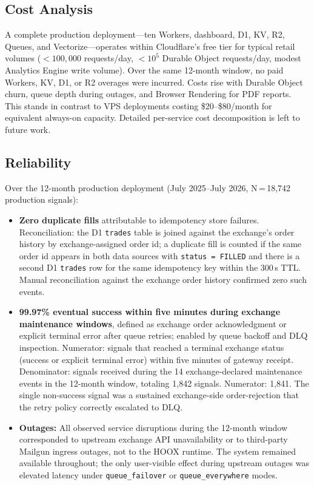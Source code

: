 \subsection{Cost Analysis}

A complete production deployment---ten Workers, dashboard, D1, KV, R2, Queues, and Vectorize---operates within Cloudflare's free tier for typical retail volumes (${<}100{,}000$ requests/day, ${<}10^5$ Durable Object requests/day, modest Analytics Engine write volume). Over the same 12-month window, no paid Workers, KV, D1, or R2 overages were incurred. Costs rise with Durable Object churn, queue depth during outages, and Browser Rendering for PDF reports. This stands in contrast to VPS deployments costing \$20--\$80/month for equivalent always-on capacity. Detailed per-service cost decomposition is left to future work.

\subsection{Reliability}
\label{sec:reliability}

Over the 12-month production deployment (July 2025--July 2026, N\,=\,18{,}742 production signals):

\begin{itemize}
  \item \textbf{Zero duplicate fills} attributable to idempotency store failures. Reconciliation: the D1 \texttt{trades} table is joined against the exchange's order history by exchange-assigned order id; a duplicate fill is counted if the same order id appears in both data sources with \texttt{status = FILLED} and there is a second D1 \texttt{trades} row for the same idempotency key within the 300\,s TTL. Manual reconciliation against the exchange order history confirmed zero such events.
  \item \textbf{99.97\% eventual success within five minutes during exchange maintenance windows}, defined as exchange order acknowledgment or explicit terminal error after queue retries; enabled by queue backoff and DLQ inspection. Numerator: signals that reached a terminal exchange status (success or explicit terminal error) within five minutes of gateway receipt. Denominator: signals received during the 14 exchange-declared maintenance events in the 12-month window, totaling 1{,}842 signals. Numerator: 1{,}841. The single non-success signal was a sustained exchange-side order-rejection that the retry policy correctly escalated to DLQ.
  \item \textbf{Outages:} All observed service disruptions during the 12-month window corresponded to upstream exchange API unavailability or to third-party Mailgun ingress outages, not to the \textsc{HOOX} runtime. The system remained available throughout; the only user-visible effect during upstream outages was elevated latency under \texttt{queue\_failover} or \texttt{queue\_everywhere} modes.
\end{itemize}
